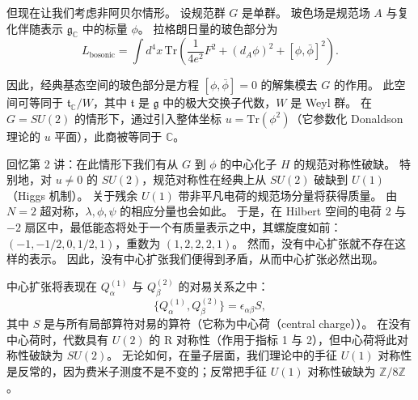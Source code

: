 但现在让我们考虑非阿贝尔情形。
设规范群 $G$ 是单群。
玻色场是规范场 $A$ 与复化伴随表示 $\mathfrak{g}_{\mathbb{C}}$ 中的标量 $\phi$。
拉格朗日量的玻色部分为
\begin{equation}
  \tag{12.23}
  \label{eq:12-23}
  L_{\text{bosonic}}=\int d^4x\,\mathrm{Tr}\left(\frac{1}{4e^2}F^2+(d_A\phi)^2+[\phi,\bar\phi]^2\right).
\end{equation}

因此，经典基态空间的玻色部分是方程 $[\phi,\bar\phi]=0$ 的解集模去 $G$ 的作用。
此空间可等同于 $\mathfrak{t}_{\mathbb{C}}/W$，其中 $\mathfrak{t}$ 是 $\mathfrak{g}$ 中的极大交换子代数，$W$ 是 Weyl 群。
在 $G=SU(2)$ 的情形下，通过引入整体坐标 $u=\mathrm{Tr}(\phi^2)$（它参数化 Donaldson 理论的 $u$ 平面），此商被等同于 $\mathbb{C}$。

回忆第 2 讲：在此情形下我们有从 $G$ 到 $\phi$ 的中心化子 $H$ 的规范对称性破缺。
特别地，对 $u\ne0$ 的 $SU(2)$，规范对称性在经典上从 $SU(2)$ 破缺到 $U(1)$（Higgs 机制）。
关于残余 $U(1)$ 带非平凡电荷的规范场分量将获得质量。
由 $N=2$ 超对称，$\lambda,\phi,\psi$ 的相应分量也会如此。
于是，在 Hilbert 空间的电荷 $2$ 与 $-2$ 扇区中，最低能态将处于一个有质量表示之中，其螺旋度如前：$(-1,-1/2,0,1/2,1)$，重数为 $(1,2,2,2,1)$。
然而，没有中心扩张就不存在这样的表示。
因此，没有中心扩张我们便得到矛盾，从而中心扩张必然出现。

中心扩张将表现在 $Q^{(1)}_\alpha$ 与 $Q^{(2)}_\beta$ 的对易关系之中：
\begin{equation}
  \tag{12.24}
  \label{eq:12-24}
  \{Q^{(1)}_\alpha,Q^{(2)}_\beta\}=\epsilon_{\alpha\beta}S,
\end{equation}
其中 $S$ 是与所有局部算符对易的算符（它称为中心荷（central charge））。
在没有中心荷时，代数具有 $U(2)$ 的 R 对称性（作用于指标 1 与 2），但中心荷将此对称性破缺为 $SU(2)$。
无论如何，在量子层面，我们理论中的手征 $U(1)$ 对称性是反常的，因为费米子测度不是不变的；反常把手征 $U(1)$ 对称性破缺为 $\mathbb{Z}/8\mathbb{Z}$。


